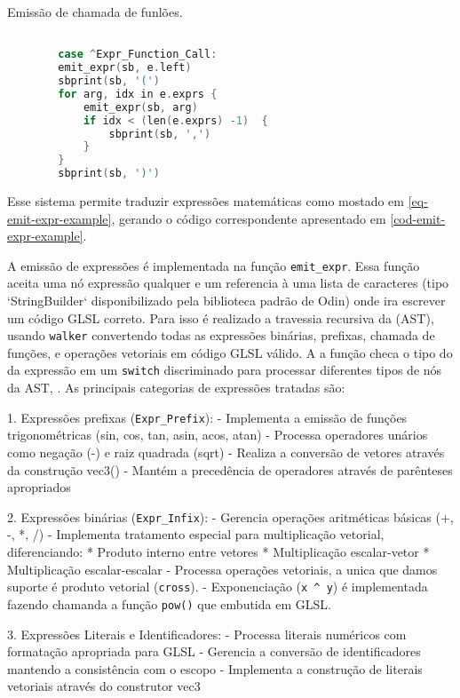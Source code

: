 \begin{codigo}[htb]
    \caption{\small Emissão de chamada de funlões. }
    \label{cod-emission-func}
\begin{lstlisting}[language=C, frame=none, inputencoding=utf8]

        case ^Expr_Function_Call:
        emit_expr(sb, e.left)
        sbprint(sb, '(')
        for arg, idx in e.exprs {
            emit_expr(sb, arg)
            if idx < (len(e.exprs) -1)  {
                sbprint(sb, ',')
            }
        }
        sbprint(sb, ')')
\end{lstlisting}
\end{codigo}

Esse sistema permite traduzir expressões matemáticas como mostado em \autoref{eq-emit-expr-example}, gerando o código correspondente apresentado em \autoref{cod-emit-expr-example}.

A emissão de expressões é implementada na função \verb`emit_expr`. Essa função aceita uma nó expressão qualquer e um referencia à uma lista de caracteres (tipo `StringBuilder` disponibilizado pela biblioteca padrão de Odin) onde ira escrever um código GLSL correto. Para isso é realizado a travessia recursiva da (AST), usando \texttt{walker} convertendo todas as expressões binárias, prefixas, chamada de funções,  e operações vetoriais em código GLSL válido. A a função checa o tipo do da expressão em um \verb`switch` discriminado para processar diferentes tipos de nós da AST, . As principais categorias de expressões tratadas são:

1. Expressões prefixas (\verb`Expr_Prefix`):
   - Implementa a emissão de funções trigonométricas (sin, cos, tan, asin, acos, atan)
   - Processa operadores unários como negação (-) e raiz quadrada (sqrt)
   - Realiza a conversão de vetores através da construção vec3()
   - Mantém a precedência de operadores através de parênteses apropriados

2. Expressões binárias (\verb`Expr_Infix`):
   - Gerencia operações aritméticas básicas (+, -, *, /)
   - Implementa tratamento especial para multiplicação vetorial, diferenciando:
     * Produto interno entre vetores
     * Multiplicação escalar-vetor
     * Multiplicação escalar-escalar
   - Processa operações vetoriais, a unica que damos suporte é produto vetorial (\verb`cross`).
   - Exponenciação (\verb'x ^ y') é implementada fazendo chamanda a função \verb`pow()` que embutida em GLSL.

3. Expressões Literais e Identificadores:
   - Processa literais numéricos com formatação apropriada para GLSL
   - Gerencia a conversão de identificadores mantendo a consistência com o escopo
   - Implementa a construção de literais vetoriais através do construtor vec3

